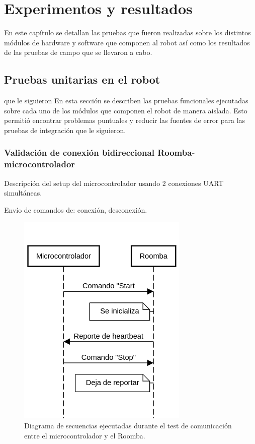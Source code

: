 
\chapter{Experimentos y resultados} %

\label{Capitulo4}

En este capítulo se detallan las pruebas que fueron realizadas sobre los distintos módulos de hardware y software que componen al robot así como los resultados de las pruebas de campo que se llevaron a cabo.

\section{Pruebas unitarias en el robot}
que le siguieron
En esta sección se describen las pruebas funcionales ejecutadas sobre cada uno de los módulos que componen el robot de manera aislada. Esto permitió encontrar problemas puntuales y reducir las fuentes de error para las pruebas de integración que le siguieron.

\subsection{Validación de conexión bidireccional Roomba-microcontrolador}

Descripción del setup del microcontrolador usando 2 conexiones UART simultáneas.

Envío de comandos de: conexión, desconexión.

\begin{figure}[ht]
    \centering
    \includegraphics[scale=0.6]{./Figures/comm_test2.png}
    \caption{Diagrama de secuencias ejecutadas durante el test de comunicación entre el microcontrolador y el Roomba.}
    \label{fig:secMicroRoomba}
\end{figure}

